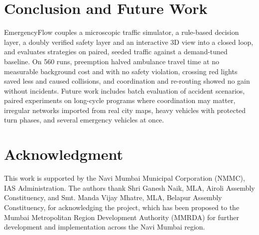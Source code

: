 \documentclass[conference]{IEEEtran}
\begin{document}
\section{Conclusion and Future Work}

EmergencyFlow couples a microscopic traffic simulator, a rule-based decision layer, a doubly verified safety layer and an interactive 3D view into a closed loop, and evaluates strategies on paired, seeded traffic against a demand-tuned baseline. On 560 runs, preemption halved ambulance travel time at no measurable background cost and with no safety violation, crossing red lights saved less and caused collisions, and coordination and re-routing showed no gain without incidents. Future work includes batch evaluation of accident scenarios, paired experiments on long-cycle programs where coordination may matter, irregular networks imported from real city maps, heavy vehicles with protected turn phases, and several emergency vehicles at once.

\section*{Acknowledgment}

This work is supported by the Navi Mumbai Municipal Corporation (NMMC), IAS Administration. The authors thank Shri Ganesh Naik, MLA, Airoli Assembly Constituency, and Smt. Manda Vijay Mhatre, MLA, Belapur Assembly Constituency, for acknowledging the project, which has been proposed to the Mumbai Metropolitan Region Development Authority (MMRDA) for further development and implementation across the Navi Mumbai region.
\end{document}
